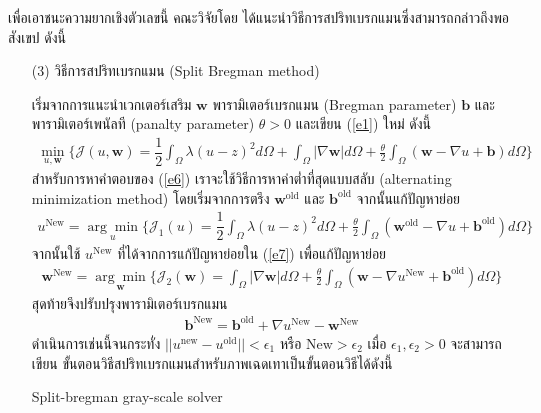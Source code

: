 \documentclass[hidelinks, a4paper,12pt]{article}
\numberwithin{equation}{section}							%
\numberwithin{equation}{section}
\begin{document}
{\hspace{1cm} เพื่อเอาชนะความยากเชิงตัวเลขนี้ คณะวิจัยโดย \cite{ref:splitbergman-inpaint} ได้แนะนำวิธีการสปริทเบรกแมนซึ่งสามารถกล่าวถึงพอสังเขป ดังนี้
\clearpage
\begin{itemize}
	\item [(3)] วิธีการสปริทเบรกแมน (Split Bregman method)
	
	เริ่มจากการแนะนำเวกเตอร์เสริม $\boldsymbol{w}$ พารามิเตอร์เบรกแมน (Bregman parameter) $\boldsymbol{b}$ และพารามิเตอร์เพนัลที (panalty parameter) $\theta>0$ และเขียน (\ref{e1}) ใหม่ ดังนี้
	\begin{align}
	\min_{u,\boldsymbol{w}} \{ \mathcal{J}(u,\boldsymbol{w}) = \dfrac{1}{2} \int_{\Omega} \lambda(u-z)^2 d\Omega +  \int_{\Omega}  |\nabla \boldsymbol{w}|  d\Omega + \frac{\theta}{2} \int_{\Omega} (\boldsymbol{w} - \nabla u + \boldsymbol{b}) d\Omega \}
	\label{e6}
	\end{align}
	สำหรับการหาคำตอบของ (\ref{e6}) เราจะใช้วิธีการหาค่าต่ำที่สุดแบบสลับ (alternating minimization method) โดยเริ่มจากการตรึง $\boldsymbol{w}^{\text{old}}$ และ $\boldsymbol{b}^{\text{old}}$ จากนั้นแก้ปัญหาย่อย
	\begin{align}
	u^{\text{New}}=\underset{u}{\arg\min} \{ \mathcal{J}_1(u) = \dfrac{1}{2} \int_{\Omega} \lambda(u-z)^2 d\Omega + \frac{\theta}{2} \int_{\Omega} (\boldsymbol{w}^{\text{old}} - \nabla u + \boldsymbol{b}^{\text{old}}) d\Omega \}
	\label{e7}
	\end{align}
	จากนั้นใช้ $u^{\text{New}}$ ที่ได้จากการแก้ปัญหาย่อยใน (\ref{e7}) เพื่อแก้ปัญหาย่อย
	\begin{align}
	\boldsymbol{w}^{\text{New}}=\underset{\boldsymbol{w}}{\arg\min} \{ \mathcal{J}_2(\boldsymbol{w}) = \int_{\Omega}  |\nabla \boldsymbol{w}|  d\Omega  + \frac{\theta}{2} \int_{\Omega} (\boldsymbol{w} - \nabla u^{\text{New}} + \boldsymbol{b}^{\text{old}}) d\Omega \}
	\label{e8}
	\end{align}
	สุดท้ายจึงปรับปรุงพารามิเตอร์เบรกแมน 
	\begin{align}
	\boldsymbol{b}^{\text{New}}=\boldsymbol{b}^{\text{old}}+\nabla u^{\text{New}}-\boldsymbol{w}^{\text{New}}
	\label{e9}
	\end{align}
	ดำเนินการเช่นนี้จนกระทั่ง $||u^{\text{new}}-u^{\text{old}}||< \epsilon_1$ หรือ $\text{New}>\epsilon_2$ เมื่อ $\epsilon_1,\epsilon_2>0$  
	\clearpage
	จะสามารถเขียน ขั้นตอนวิธีสปริทเบรกแมนสำหรับภาพเฉดเทาเป็นขั้นตอนวิธีได้ดังนี้ 
	\begin{algorithm}[H]
		\caption{Split-bregman gray-scale solver}
		\KwIn{
			\\
}
\end{algorithm}
\end{itemize}}
\end{document}
